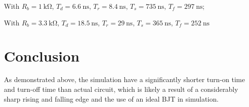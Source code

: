 \documentclass{article}
\begin{document}
With $R_b = \SI{1}{\kilo\ohm}$, $T_d=\SI{6.6}{\nano\second}$, $T_r=\SI{8.4}{\nano\second}$, $T_s=\SI{735}{\nano\second}$, $T_f=\SI{297}{\nano\second}$;

With $R_b = \SI{3.3}{\kilo\ohm}$, $T_d=\SI{18.5}{\nano\second}$, $T_r=\SI{29}{\nano\second}$, $T_s=\SI{365}{\nano\second}$, $T_f=\SI{252}{\nano\second}$


\section*{Conclusion}
As demonstrated above, the simulation have a significantly shorter turn-on time and turn-off time than actual circuit, which is likely a result of a considerably sharp rising and falling edge and the use of an ideal BJT in simulation.
\end{document}
